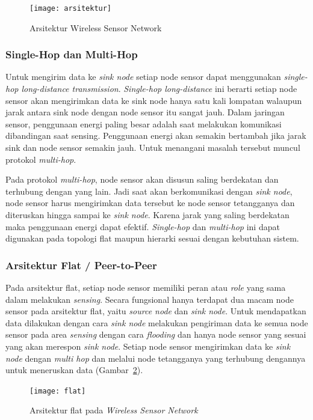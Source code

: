 \begin{figure} [H]
	\centering  
	\texttt{[image: arsitektur]}  
	\caption[Arsitektur Wireless Sensor Network]{Arsitektur Wireless Sensor Network} 
	\label{fig:arsitektur} 
\end{figure} 

\subsubsection{Single-Hop dan Multi-Hop}
Untuk mengirim data ke \textit{sink node} setiap node sensor dapat menggunakan \textit{single-hop long-distance transmission}. \textit{Single-hop long-distance} ini berarti setiap node sensor akan mengirimkan data ke sink node hanya satu kali lompatan walaupun jarak antara sink node dengan node sensor itu sangat jauh. Dalam jaringan sensor, penggunaan energi paling besar adalah saat melakukan komunikasi dibandingan saat sensing. Penggunaan energi akan semakin bertambah jika jarak sink dan node sensor semakin jauh. Untuk menangani masalah tersebut muncul protokol \textit{multi-hop}.

Pada protokol \textit{multi-hop}, node sensor akan disusun saling berdekatan dan terhubung dengan yang lain. Jadi saat akan berkomunikasi dengan \textit{sink node}, node sensor harus mengirimkan data tersebut ke node sensor tetangganya dan diteruskan hingga sampai ke \textit{sink node}. Karena jarak yang saling berdekatan maka penggunaan energi dapat efektif. \textit{Single-hop} dan \textit{multi-hop} ini dapat digunakan pada topologi flat maupun hierarki sesuai dengan kebutuhan sistem.

\subsubsection{Arsitektur Flat / Peer-to-Peer}
Pada arsitektur flat, setiap node sensor memiliki peran atau \textit{role} yang sama dalam melakukan \textit{sensing}. Secara fungsional hanya terdapat dua macam node sensor pada arsitektur flat, yaitu \textit{source node} dan \textit{sink node}. Untuk mendapatkan data dilakukan dengan cara \textit{sink node} melakukan pengiriman data ke semua node sensor pada area \textit{sensing} dengan cara \textit{flooding} dan hanya node sensor yang sesuai yang akan merespon \textit{sink node}. Setiap node sensor mengirimkan data ke \textit{sink node} dengan \textit{multi hop} dan melalui node tetangganya yang terhubung dengannya untuk meneruskan data (Gambar~\ref{fig:flat}).
\begin{figure} [H]
	\centering  
	\texttt{[image: flat]}  
	\caption[Arsitektur flat pada \textit{Wireless Sensor Network}]{Arsitektur flat pada \textit{Wireless Sensor Network}} 
	\label{fig:flat} 
\end{figure} 

